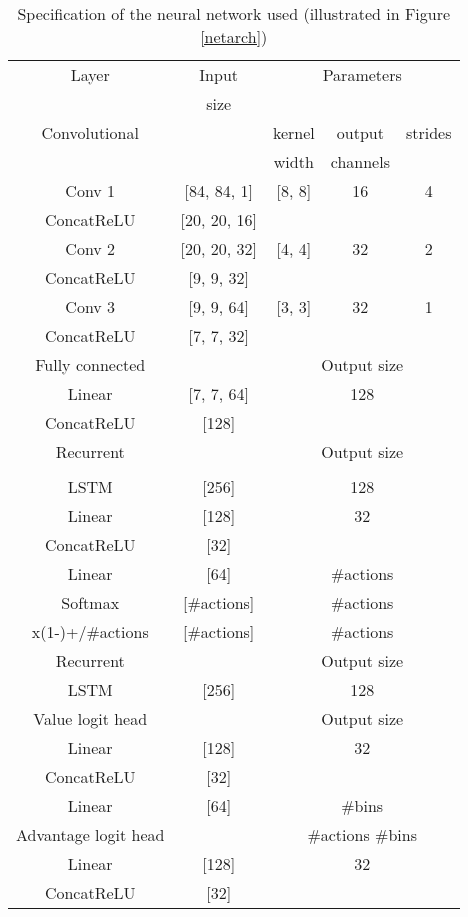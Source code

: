 \documentclass{article}
\begin{document}
\begin{table}[ht]
\caption{Specification of the neural network used (illustrated in Figure 
\ref{netarch})}
\label{specs-table}
\vskip 0.1in
\begin{center}
\begin{sc}
\begin{tabular}{| c | c | c | c | c |}
\hline
Layer & Input & \multicolumn{3}{|c|}{ Parameters} \\
      & size  & \multicolumn{3}{|c|}{ } \\
\hline
Convolutional & & kernel & output & strides\\
              & & width & channels & \\
\hline
Conv 1 & [84, 84, 1] & [8, 8] & 16 & 4 \\
ConcatReLU & [20, 20, 16] & & & \\
Conv 2 & [20, 20, 32] & [4, 4] & 32 & 2 \\
ConcatReLU & [9, 9, 32] & & & \\
Conv 3 & [9, 9, 64] & [3, 3] & 32 & 1 \\
ConcatReLU & [7, 7, 32] & & & \\
\hline
Fully connected & & \multicolumn{3}{|c|}{ Output size} \\
\hline
Linear & [7, 7, 64] & \multicolumn{3}{|c|}{ 128 }\\
ConcatReLU & [128] & \multicolumn{3}{|c|}{} \\
\hline
Recurrent & & \multicolumn{3}{|c|}{ Output size} \\
 & & \multicolumn{3}{|c|}{ } \\
\hline
LSTM & [256] & \multicolumn{3}{|c|}{ 128 }\\
Linear & [128] & \multicolumn{3}{|c|}{ 32 }\\
ConcatReLU & [32] & \multicolumn{3}{|c|}{ }\\
Linear & [64] & \multicolumn{3}{|c|}{ \#actions }\\
Softmax & [\#actions] & \multicolumn{3}{|c|}{ \#actions }\\
x(1-)+/\#actions & [\#actions] & \multicolumn{3}{|c|}{ 
\#actions }\\
\hline
Recurrent  & & \multicolumn{3}{|c|}{ Output size} \\
\hline
LSTM & [256] & \multicolumn{3}{|c|}{ 128 }\\
\hline
Value logit head & & \multicolumn{3}{|c|}{  Output size} \\
\hline
Linear & [128] & \multicolumn{3}{|c|}{ 32 }\\
ConcatReLU & [32] & \multicolumn{3}{|c|}{ }\\
Linear & [64] & \multicolumn{3}{|c|}{ \#bins }\\
\hline
Advantage logit head & & \multicolumn{3}{|c|}{ \#actions  \#bins} \\
\hline
Linear & [128] & \multicolumn{3}{|c|}{ 32 }\\
ConcatReLU & [32] & \multicolumn{3}{|c|}{ }\\
\hline
\end{tabular}
\end{sc}
\end{center}
\vskip -0.1in
\end{table}
\newpage
\end{document}
